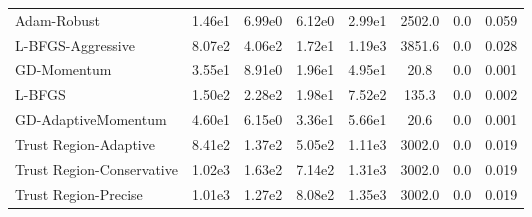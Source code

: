 \documentclass{article}
\begin{document}
\begin{table}[htbp]
{\begin{tabular}{p{2.5cm}*{7}{c}}
Adam-Robust & 1.46e1 & 6.99e0 & 6.12e0 & 2.99e1 & 2502.0 & 0.0 & 0.059 \\
L-BFGS-Aggressive & 8.07e2 & 4.06e2 & 1.72e1 & 1.19e3 & 3851.6 & 0.0 & 0.028 \\
GD-Momentum & 3.55e1 & 8.91e0 & 1.96e1 & 4.95e1 & 20.8 & 0.0 & 0.001 \\
L-BFGS & 1.50e2 & 2.28e2 & 1.98e1 & 7.52e2 & 135.3 & 0.0 & 0.002 \\
GD-AdaptiveMomentum & 4.60e1 & 6.15e0 & 3.36e1 & 5.66e1 & 20.6 & 0.0 & 0.001 \\
Trust Region-Adaptive & 8.41e2 & 1.37e2 & 5.05e2 & 1.11e3 & 3002.0 & 0.0 & 0.019 \\
Trust Region-Conservative & 1.02e3 & 1.63e2 & 7.14e2 & 1.31e3 & 3002.0 & 0.0 & 0.019 \\
Trust Region-Precise & 1.01e3 & 1.27e2 & 8.08e2 & 1.35e3 & 3002.0 & 0.0 & 0.019 \\
\bottomrule
\end{tabular}
}
\end{table}
\end{document}

